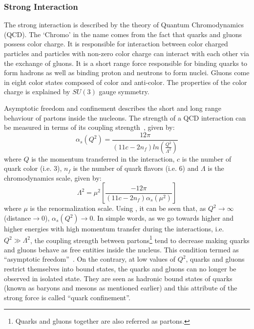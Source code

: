 \subsubsection{Strong Interaction}
The strong interaction is described by the theory of Quantum Chromodynamics (\gls{QCD}). The `Chromo' in the name comes from the fact that quarks 
and gluons possess color charge. It is responsible for interaction between color charged particles and particles with non-zero color charge can 
interact with each other via the exchange of gluons. It is a short range force responsible for binding quarks to form hadrons as well as binding 
proton and neutrons to form nuclei. Gluons come in eight color states composed of color and anti-color. The properties of the color
charge is explained by $SU(3)$ gauge symmetry. %

Asymptotic freedom and confinement describes the short and long range behaviour of partons inside the nucleons. The strength of a
QCD interaction can be measured in terms of its coupling strength~\cite{Kluth:2006vf}, given by:
\begin{equation}
\alpha_{s}(Q^{2})= \frac{12\pi}{(11c-2n_{f})ln\left(\frac{Q^{2}}{\Lambda^{2}}\right)}
\label{eg:alpha_s}
\end{equation}
where $Q$ is the momentum transferred in the interaction, $c$ is the number of quark color (i.e. 3), $n_{f}$ is the number of quark flavors (i.e. 6)
and $\Lambda$ is the chromodynamics scale, given by:
\begin{equation}
\Lambda^{2}  = \mu^{2} \left[  \frac{-12\pi}{(11c-2n_{f}) \alpha_{s}(\mu^{2})  } \right]
\end{equation}
where $\mu$ is the renormalization scale. Using \eqn{\ref{eg:alpha_s}}, it can be seen that, as  
$Q^{2}\to\infty$ (distance$\to0$), $\alpha_{s}(Q^{2})\to0$. In simple words, as we go towards higher and higher energies with high momentum
transfer during the interactions, i.e. $Q^{2}\gg\Lambda^{2}$, the coupling strength between partons\footnote{Quarks and gluons together
are also referred as partons.} tend to decrease making quarks and gluons behave as free entities inside the nucleus. This condition termed as 
``asymptotic freedom''~\cite{Gross:1973ju,Gross:1974cs,Politzer:1974fr}. On the contrary, at low values of $Q^{2}$, quarks and gluons restrict 
themselves into bound states, the quarks and gluons can no longer be observed in isolated state. They are seen as hadronic bound states of quarks 
(known as baryons and mesons as mentioned earlier) and this attribute of the strong force is called ``quark confinement''.


